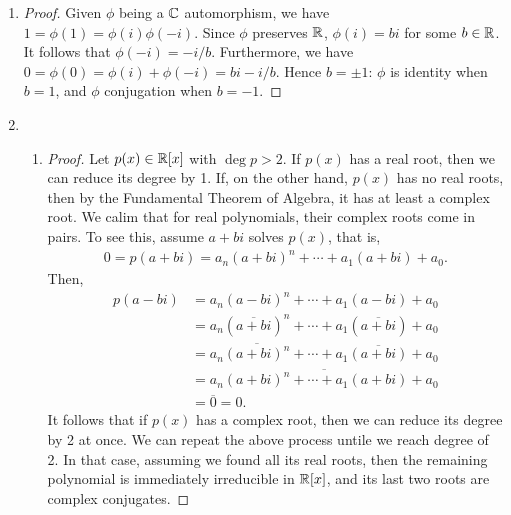\documentclass[11pt]{article}
\begin{document}

\pagestyle{fancy}
\fancyhf{}
\cfoot{\thepage}

\begin{enumerate}[label=\text{A1.\arabic*}.]
    \item %
        \begin{proof}
            Given $\phi$ being a $\mathbb{C}$ automorphism, we have $1=\phi(1) = \phi(i)\phi(-i)$. Since $\phi$ preserves $\mathbb{R}$, $\phi(i) = b i$ for some $b\in\mathbb{R}$. It follows that $\phi(-i) = -i/b$. Furthermore, we have $0=\phi(0) = \phi(i) + \phi(-i) = bi - i/b$. Hence $b=\pm 1$: $\phi$ is identity when $b=1$, and $\phi$ conjugation when $b=-1$. 
        \end{proof}

    \item
        \begin{enumerate}
            \item 
                \begin{proof}
                    Let $p(x) \in \mathbb{R}[x]$ with $\deg p > 2$. If $p(x)$ has a real root, then we can reduce its degree by 1. If, on the other hand, $p(x)$ has no real roots, then by the Fundamental Theorem of Algebra, it has at least a complex root. We calim that for real polynomials, their complex roots come in pairs. To see this, assume $a+bi$ solves $p(x)$, that is,
                    \begin{align*}
                        0 = p(a+bi) = a_n(a+bi)^n + \cdots + a_1 (a+bi) + a_0 \text{.}
                    \end{align*}
                    Then,
                    \begin{align*}
                        p(a-bi) &= a_n(a-bi)^n + \cdots + a_1 (a-bi) + a_0 \\
                        &= a_n (\overline{a+bi})^n + \cdots + a_1 (\overline{a+bi}) + a_0 \\
                        &= a_n \overline{(a+bi)^n} + \cdots + a_1 \overline{(a+bi)} + a_0 \\
                        &= \overline{a_n(a+bi)^n + \cdots + a_1 (a+bi) + a_0} \\
                        &= \overline{0} = 0 \text{.}
                    \end{align*}
                    It follows that if $p(x)$ has a complex root, then we can reduce its degree by 2 at once. We can repeat the above process untile we reach degree of 2. In that case, assuming we found all its real roots, then the remaining polynomial is immediately irreducible in $\mathbb{R}[x]$, and its last two roots are complex conjugates.


\end{proof}
\end{enumerate}
\end{enumerate}
\end{document}
